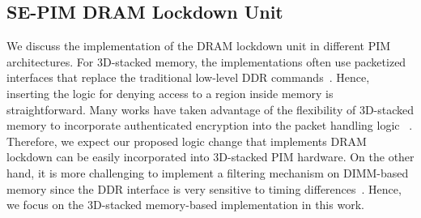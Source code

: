 \subsection{SE-PIM DRAM Lockdown Unit} 

We discuss the implementation of the DRAM lockdown unit in different PIM architectures. For 3D-stacked memory, the implementations often use packetized interfaces that replace the traditional low-level DDR commands~\cite{hmc-spec,invisimem,hmc}. Hence, inserting the logic for denying access to a region inside memory is straightforward. Many works have taken advantage of the flexibility of 3D-stacked memory to incorporate authenticated encryption into the packet handling logic ~\cite{invisimem,obfusmem}. Therefore, we expect our proposed logic change that implements DRAM lockdown can be easily incorporated into 3D-stacked PIM hardware. On the other hand, it is more challenging to implement a filtering mechanism on DIMM-based memory since the DDR interface is very sensitive to timing differences~\cite{micronddr4}. Hence, we focus on the 3D-stacked memory-based implementation in this work.


